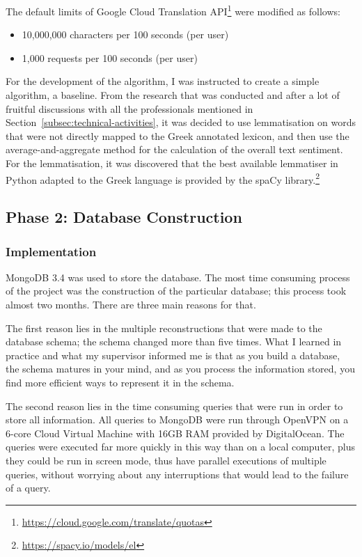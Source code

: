 The default limits of Google Cloud Translation API\footnote {\url {https://cloud.google.com/translate/quotas}} were modified as follows:

\begin{itemize}
 \item 10,000,000 characters per 100 seconds (per user)
 \item 1,000 requests per 100 seconds (per user)
\end{itemize}

For the development of the algorithm,
I was instructed to create a simple algorithm, a baseline.
From the research that was conducted and after a lot of fruitful discussions
with all the professionals mentioned
in Section~\ref{subsec:technical-activities},
it was decided to use lemmatisation on words that were not directly mapped
to the Greek annotated lexicon,
and then use the average-and-aggregate method
for the calculation of the overall text sentiment.
For the lemmatisation, it was discovered
that the best available lemmatiser in Python
adapted to the Greek language is provided
by the spaCy library.\footnote{\url {https://spacy.io/models/el}}

\subsection{Phase 2: Database Construction}
\label{subsec:database}

\subsubsection{Implementation}
\label{subsubsec:dbimplementation}

MongoDB 3.4 was used to store the database.
The most time consuming process of the project
was the construction of the particular database;
this process took almost two months.
There are three main reasons for that.

The first reason lies in the multiple reconstructions
that were made to the database schema;
the schema changed more than five times.
What I learned in practice and what my supervisor informed me is
that as you build a database,
the schema matures in your mind,
and as you process the information stored,
you find more efficient ways to represent it in the schema.

The second reason lies in the time consuming queries
that were run in order to store all information.
All queries to MongoDB were run through OpenVPN
on a 6-core Cloud Virtual Machine with 16GB RAM
provided by DigitalOcean.
The queries were executed far more quickly in this way
than on a local computer, plus they could be run
in screen mode, thus have parallel executions of multiple queries,
without worrying about any interruptions
that would lead to the failure of a query.

